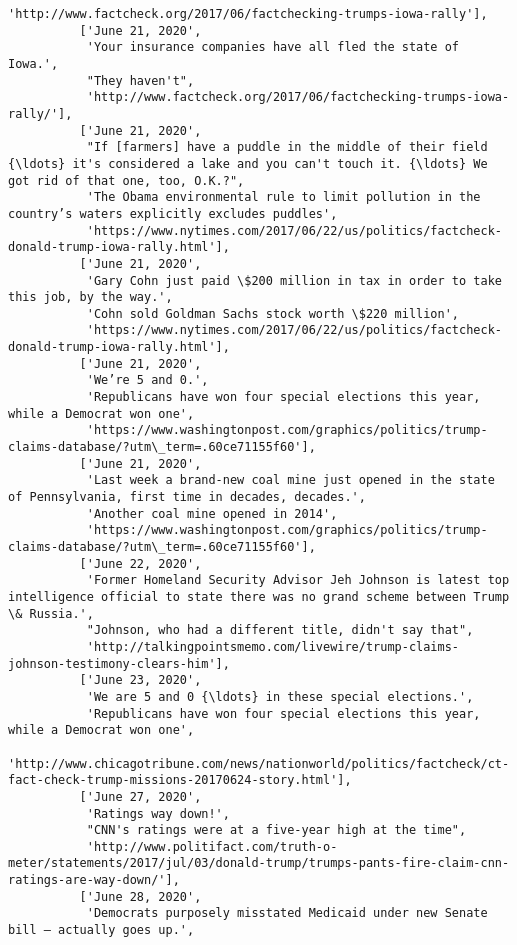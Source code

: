 \documentclass[11pt]{article}
\begin{document}
\begin{Verbatim}[commandchars=\\\{\}]
           'http://www.factcheck.org/2017/06/factchecking-trumps-iowa-rally'],
          ['June 21, 2020',
           'Your insurance companies have all fled the state of Iowa.',
           "They haven't",
           'http://www.factcheck.org/2017/06/factchecking-trumps-iowa-rally/'],
          ['June 21, 2020',
           "If [farmers] have a puddle in the middle of their field {\ldots} it's considered a lake and you can't touch it. {\ldots} We got rid of that one, too, O.K.?",
           'The Obama environmental rule to limit pollution in the country’s waters explicitly excludes puddles',
           'https://www.nytimes.com/2017/06/22/us/politics/factcheck-donald-trump-iowa-rally.html'],
          ['June 21, 2020',
           'Gary Cohn just paid \$200 million in tax in order to take this job, by the way.',
           'Cohn sold Goldman Sachs stock worth \$220 million',
           'https://www.nytimes.com/2017/06/22/us/politics/factcheck-donald-trump-iowa-rally.html'],
          ['June 21, 2020',
           'We’re 5 and 0.',
           'Republicans have won four special elections this year, while a Democrat won one',
           'https://www.washingtonpost.com/graphics/politics/trump-claims-database/?utm\_term=.60ce71155f60'],
          ['June 21, 2020',
           'Last week a brand-new coal mine just opened in the state of Pennsylvania, first time in decades, decades.',
           'Another coal mine opened in 2014',
           'https://www.washingtonpost.com/graphics/politics/trump-claims-database/?utm\_term=.60ce71155f60'],
          ['June 22, 2020',
           'Former Homeland Security Advisor Jeh Johnson is latest top intelligence official to state there was no grand scheme between Trump \& Russia.',
           "Johnson, who had a different title, didn't say that",
           'http://talkingpointsmemo.com/livewire/trump-claims-johnson-testimony-clears-him'],
          ['June 23, 2020',
           'We are 5 and 0 {\ldots} in these special elections.',
           'Republicans have won four special elections this year, while a Democrat won one',
           'http://www.chicagotribune.com/news/nationworld/politics/factcheck/ct-fact-check-trump-missions-20170624-story.html'],
          ['June 27, 2020',
           'Ratings way down!',
           "CNN's ratings were at a five-year high at the time",
           'http://www.politifact.com/truth-o-meter/statements/2017/jul/03/donald-trump/trumps-pants-fire-claim-cnn-ratings-are-way-down/'],
          ['June 28, 2020',
           'Democrats purposely misstated Medicaid under new Senate bill — actually goes up.',

\end{Verbatim}
\end{document}
